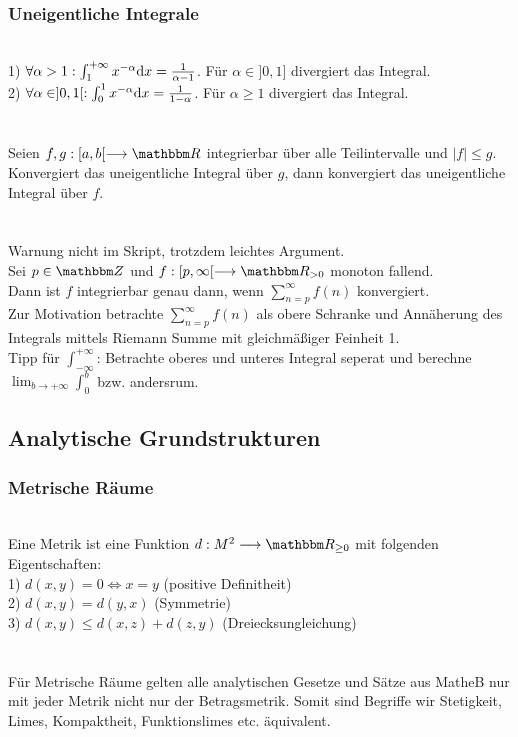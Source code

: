 \subsubsection*{Uneigentliche Integrale}
 \\
1) \(\forall \alpha > 1: \int_{1}^{+\infty} x^{-\alpha} \text d x = \frac{1}{\alpha - 1}\). \puffer Für \(\alpha \in {]0{,}1]}\) divergiert das Integral. \\
2) \(\forall \alpha \in ]0,1[: \int_{0}^{1}x^{-\alpha} \text d x = \frac{1}{1 - \alpha}\). \puffer Für \(\alpha \ge 1\) divergiert das Integral. \\ \\
 \\
Seien \(f,g: [a,b[ \longrightarrow \R\) integrierbar über alle Teilintervalle und \(|f| \le g\). \\
Konvergiert das uneigentliche Integral über \(g\), dann konvergiert das uneigentliche Integral über \(f\). \\ \\
 \\
Warnung nicht im Skript, trotzdem leichtes Argument. \\
Sei \(p \in \Z\) und \(f : [p, \infty[ \longrightarrow \R_{> 0}\) monoton fallend. \\
Dann ist \(f\) integrierbar genau dann, wenn \(\sum_{n = p}^{\infty} f(n)\) konvergiert. \\
Zur Motivation betrachte \(\sum_{n = p}^{\infty} f(n)\) als obere Schranke und Annäherung des Integrals mittels Riemann Summe mit gleichmäßiger Feinheit 1.\\
Tipp für \(\int_{-\infty}^{+\infty}\): Betrachte oberes und unteres Integral seperat und berechne \(\lim_{b \rightarrow +\infty} \int_{0}^{b}\) bzw. andersrum.
\subsection*{Analytische Grundstrukturen}
\subsubsection*{Metrische Räume}
 \\
Eine Metrik ist eine Funktion \(d : M^2 \longrightarrow \R_{\ge 0}\) mit folgenden Eigentschaften:\\
1) \(d(x,y) = 0 \Longleftrightarrow x = y\) \puffer \puffer \gap \gap (positive Definitheit) \\
2) \(d(x,y) = d(y,x)\) \puffer \puffer \puffer \puffer \gap \gap \gap (Symmetrie) \\
3) \(d(x,y) \le d(x,z) + d(z,y)\) \puffer (Dreiecksungleichung) \\ \\
 \\
Für Metrische Räume gelten alle analytischen Gesetze und Sätze aus MatheB nur mit jeder Metrik nicht nur der Betragsmetrik.
Somit sind Begriffe wir Stetigkeit, Limes, Kompaktheit, Funktionslimes etc. äquivalent.
